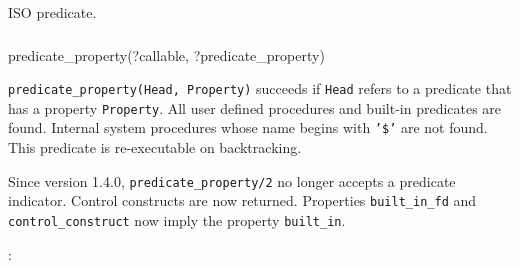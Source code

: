 \Portability

ISO predicate.

\subsubsection{\label{predicate-property/2}}

\begin{TemplatesOneCol}
predicate\_property(?callable, ?predicate\_property)

\end{TemplatesOneCol}

\Description

\texttt{predicate\_property(Head, Property)} succeeds if \texttt{Head} refers
to a predicate that has a property \texttt{Property}. All user defined
procedures and built-in predicates are found. Internal system procedures
whose name begins with \texttt{'\$'} are not found. This predicate is
re-executable on backtracking.

Since version 1.4.0, \texttt{predicate\_property/2} no longer accepts a
predicate indicator. Control constructs are now returned. Properties
\texttt{built\_in\_fd} and \texttt{control\_construct} now imply the property
\texttt{built\_in}.

:

